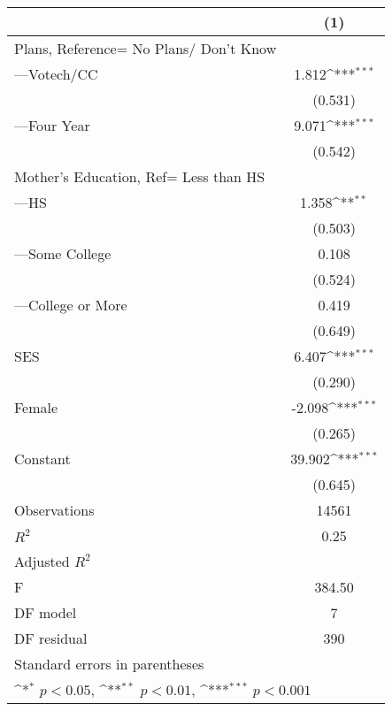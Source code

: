 {
\def\sym#1{\ifmmode^{#1}\else\(^{#1}\)\fi}
\begin{tabular}{l*{1}{c}}
\hline\hline
                                                  &\multicolumn{1}{c}{(1)}         \\
\hline
Plans, Reference= No Plans/ Don't Know            &                     \\
[1em]
---Votech/CC                                      &       1.812\sym{***}\\
                                                  &     (0.531)         \\
[1em]
---Four Year                                      &       9.071\sym{***}\\
                                                  &     (0.542)         \\
[1em]
Mother's Education, Ref= Less than HS             &                     \\
[1em]
---HS                                             &       1.358\sym{**} \\
                                                  &     (0.503)         \\
[1em]
---Some College                                   &       0.108         \\
                                                  &     (0.524)         \\
[1em]
---College or More                                &       0.419         \\
                                                  &     (0.649)         \\
[1em]
SES                                               &       6.407\sym{***}\\
                                                  &     (0.290)         \\
[1em]
Female                                            &      -2.098\sym{***}\\
                                                  &     (0.265)         \\
[1em]
Constant                                          &      39.902\sym{***}\\
                                                  &     (0.645)         \\
\hline
Observations                                      &       14561         \\
\(R^{2}\)                                         &        0.25         \\
Adjusted \(R^{2}\)                                &                     \\
F                                                 &      384.50         \\
DF model                                          &           7         \\
DF residual                                       &         390         \\
\hline\hline
\multicolumn{2}{l}{\footnotesize Standard errors in parentheses}\\
\multicolumn{2}{l}{\footnotesize \sym{*} \(p<0.05\), \sym{**} \(p<0.01\), \sym{***} \(p<0.001\)}\\
\end{tabular}
}
